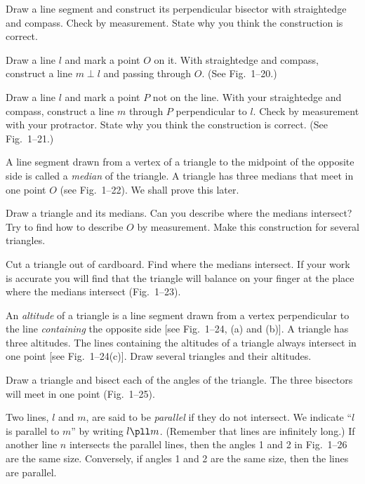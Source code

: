 \documentclass[11pt]{book}
\theoremstyle{bkplain}
\theoremstyle{XIplainnote}
\theoremstyle{bkplain}
\theoremstyle{bkplain}
\begin{document}
\begin{exercisecols}
\begin{exlist}
      Draw a line segment and construct its perpendicular bisector with
      straightedge and compass. Check by measurement. State why you think the
      construction is correct.
\exfig{\FIGININETEEN}
\item Draw a line $l$ and mark a point $O$ on it. With straightedge and compass,
      construct a line $m \perp l$ and passing through $O$. (See Fig.~1--20.)
\exfig{\FIGITWENTY}
\item Draw a line $l$ and mark a point $P$ not on the line. With your straightedge
      and compass, construct a line $m$ through $P$ perpendicular to $l$. Check by
      measurement with your protractor. State why you think the construction is
      correct. (See Fig.~1--21.)
\exfig{\FIGITWENTYONE}
\item A line segment drawn from a vertex of a triangle to the midpoint of the
      opposite side is called a \emph{median} of the triangle. A triangle has
      three medians that meet in one point $O$ (see Fig.~1--22). We shall prove
      this later.

      Draw a triangle and its medians. Can you describe where the medians
      intersect? Try to find how to describe $O$ by measurement. Make this
      construction for several triangles.
\exfig{\FIGITWENTYTWO}
\item Cut a triangle out of cardboard. Find where the medians intersect. If your
      work is accurate you will find that the triangle will balance on your finger
      at the place where the medians intersect (Fig.~1--23).
\exfig{\FIGITWENTYTHREE}
\item An \emph{altitude} of a triangle is a line segment drawn from a vertex
      perpendicular to the line \emph{containing} the opposite side [see
      Fig.~1--24, (a) and (b)]. A triangle has three altitudes. The lines
      containing the altitudes of a triangle always intersect in one point [see
      Fig.~1--24(c)]. Draw several triangles and their altitudes.
\exfig{\FIGITWENTYFOUR}
\item Draw a triangle and bisect each of the angles of the triangle. The three
      bisectors will meet in one point (Fig.~1--25).
\exfig{\FIGITWENTYFIVE}
\item Two lines, $l$ and $m$, are said to be \emph{parallel} if they do not
      intersect. We indicate ``$l$ is parallel to $m$'' by writing $l \pll m$.
      (Remember that lines are infinitely long.) If another line $n$ intersects
      the parallel lines, then the angles 1 and 2 in Fig.~1--26 are the same size.
      Conversely, if angles 1 and 2 are the same size, then the lines are
      parallel.


\end{exlist}
\end{exercisecols}
\end{document}
